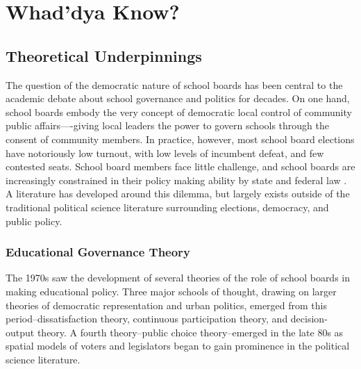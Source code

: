 \chapter{Whad'dya Know?}
\label{chap:theoryreview}


\section{Theoretical Underpinnings}
The question of the democratic nature of school boards has been central to the academic debate about school governance and politics for decades. On one hand, school boards embody the very concept of democratic local control of community public affairs—-giving local leaders the power to govern schools through the consent of community members. In practice, however, most school board elections have notoriously low turnout, with low levels of incumbent defeat, and few contested seats. School board members face little challenge, and school boards are increasingly constrained in their policy making ability by state and federal law \citep{RefWorks:318}. A literature has developed around this dilemma, but largely exists outside of the traditional political science literature surrounding elections, democracy, and public policy.

\subsection{Educational Governance Theory}
The 1970s saw the development of several theories of the role of school boards in making educational policy. Three major schools of thought, drawing on larger theories of democratic representation and urban politics, emerged from this period--dissatisfaction theory, continuous participation theory, and decision-output theory. A fourth theory--public choice theory--emerged in the late 80s as spatial models of voters and legislators began to gain prominence in the political science literature.


